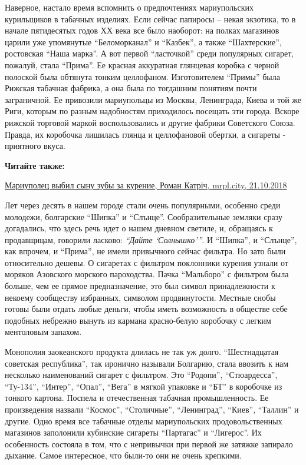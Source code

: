 Наверное, настало время вспомнить о предпочтениях мариупольских курильщиков в
табачных изделиях. Если сейчас папиросы – некая экзотика, то в начале
пятидесятых годов ХХ века все было наоборот: на полках магазинов царили уже
упомянутые \enquote{Беломорканал} и \enquote{Казбек}, а также \enquote{Шахтерские}, ростовская \enquote{Наша
марка}. А вот первой \enquote{ласточкой} среди популярных сигарет, пожалуй, стала
\enquote{Прима}. Ее красная аккуратная глянцевая коробка с черной полоской была
обтянута тонким целлофаном. Изготовителем \enquote{Примы} была Рижская табачная
фабрика, а она была по тогдашним понятиям почти заграничной. Ее привозили
мариупольцы из Москвы, Ленинграда, Киева и той же Риги, которым по разным
надобностям приходилось посещать эти города. Вскоре рижской торговой маркой
воспользовались и другие фабрики Советского Союза. Правда, их коробочка
лишилась глянца и целлофановой обертки, а сигареты - приятного вкуса.

\vspace{0.5cm}
\begin{minipage}{0.9\textwidth}
\textbf{Читайте также:} 

\href{https://mrpl.city/news/view/mariupolets-vybil-synu-zuby-za-kurenie}{%
Мариуполец выбил сыну зубы за курение, Роман Катріч, mrpl.city, 21.10.2018}
\end{minipage}
\vspace{0.5cm}


Лет через десять в нашем городе стали очень популярными, особенно среди
молодежи, болгарские \enquote{Шипка} и \enquote{Слънце}. Сообразительные
земляки сразу догадались, что здесь речь идет о нашем дневном светиле, и,
обращаясь к продавщицам, говорили ласково: \emph{\enquote{Дайте \enquote{Солнышко}}}.
И \enquote{Шипка}, и \enquote{Слънце}, как впрочем, и \enquote{Прима}, не имели
привычного сейчас фильтра. Но зато были относительно дешевы. О сигаретах с
фильтром поклонники курения узнали от моряков Азовского морского пароходства.
Пачка \enquote{Мальборо} с фильтром была больше, чем ее прямое предназначение,
это был символ принадлежности к некоему сообществу избранных, символом
продвинутости. Местные снобы готовы были отдать любые деньги, чтобы иметь
возможность в обществе себе подобных небрежно вынуть из кармана красно-белую
коробочку с легким ментоловым запахом.

Монополия заокеанского продукта длилась не так уж долго. \enquote{Шестнадцатая
советская республика}, так иронично называли Болгарию, стала ввозить к нам
несколько наименований сигарет с фильтром. Это \enquote{Родопи},
\enquote{Стюардесса}, \enquote{Ту-134}, \enquote{Интер}, \enquote{Опал},
\enquote{Вега} в мягкой упаковке и \enquote{БТ} в коробочке из тонкого картона.
Поспела и отечественная табачная промышленность. Ее произведения назвали
\enquote{Космос}, \enquote{Столичные}, \enquote{Ленинград}, \enquote{Киев},
\enquote{Таллин} и другие. Одно время все табачные отделы мариупольских
продовольственных магазинов заполонили кубинские сигареты \enquote{Партагас} и
\enquote{Лигерос}. Их особенность состояла в том, что с непривычки при первой
же затяжке запирало дыхание. Самое интересное, что были-то они не очень
крепкими.

